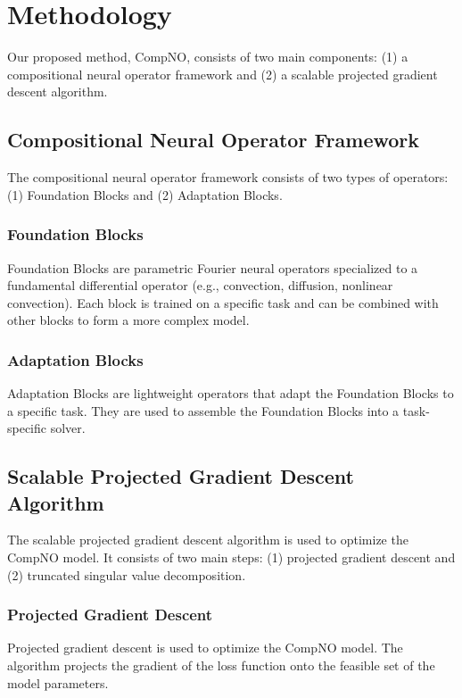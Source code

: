 \documentclass{article}
\begin{document}
\section{Methodology}

Our proposed method, CompNO, consists of two main components: (1) a compositional neural operator framework and (2) a scalable projected gradient descent algorithm.

\subsection{Compositional Neural Operator Framework}

The compositional neural operator framework consists of two types of operators: (1) Foundation Blocks and (2) Adaptation Blocks.

\subsubsection{Foundation Blocks}

Foundation Blocks are parametric Fourier neural operators specialized to a fundamental differential operator (e.g., convection, diffusion, nonlinear convection). Each block is trained on a specific task and can be combined with other blocks to form a more complex model.

\subsubsection{Adaptation Blocks}

Adaptation Blocks are lightweight operators that adapt the Foundation Blocks to a specific task. They are used to assemble the Foundation Blocks into a task-specific solver.

\subsection{Scalable Projected Gradient Descent Algorithm}

The scalable projected gradient descent algorithm is used to optimize the CompNO model. It consists of two main steps: (1) projected gradient descent and (2) truncated singular value decomposition.

\subsubsection{Projected Gradient Descent}

Projected gradient descent is used to optimize the CompNO model. The algorithm projects the gradient of the loss function onto the feasible set of the model parameters.
\end{document}
